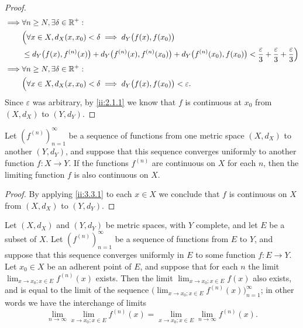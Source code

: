 \begin{proof}
\begin{align*}
    \implies & \forall n \geq N, \exists \delta \in \mathbb{R}^+ :                                                                                                                                                    \\
             & \Big(\forall x \in X, d_X(x, x_0) < \delta \implies d_Y\big(f(x), f(x_0)\big)                                                                                                                  \\
             & \leq d_Y\big(f(x), f^{(n)}(x)\big) + d_Y\big(f^{(n)}(x), f^{(n)}(x_0)\big) + d_Y\big(f^{(n)}(x_0), f(x_0)\big) < \dfrac{\varepsilon}{3} + \dfrac{\varepsilon}{3} + \dfrac{\varepsilon}{3}\Big) \\
    \implies & \forall n \geq N, \exists \delta \in \mathbb{R}^+ :                                                                                                                                                    \\
             & \Big(\forall x \in X, d_X(x, x_0) < \delta \implies d_Y\big(f(x), f(x_0)\big) < \varepsilon.
  \end{align*}
  Since \(\varepsilon\) was arbitrary, by \cref{ii:2.1.1} we know that \(f\) is continuous at \(x_0\) from \((X, d_X)\) to \((Y, d_Y)\).
\end{proof}

\begin{cor}\label{ii:3.3.2}
  Let \((f^{(n)})_{n = 1}^\infty\) be a sequence of functions from one metric space \((X, d_X)\) to another \((Y, d_Y)\), and suppose that this sequence converges uniformly to another function \(f : X \to Y\).
  If the functions \(f^{(n)}\) are continuous on \(X\) for each \(n\), then the limiting function \(f\) is also continuous on \(X\).
\end{cor}

\begin{proof}
  By applying \cref{ii:3.3.1} to each \(x \in X\) we conclude that \(f\) is continuous on \(X\) from \((X, d_X)\) to \((Y, d_Y)\).
\end{proof}

\begin{prop}\label{ii:3.3.3}
  Let
  \((X, d_X)\) and \((Y, d_Y)\) be metric spaces, with \(Y\) complete, and let \(E\) be a subset of \(X\).
  Let \((f^{(n)})_{n = 1}^\infty\) be a sequence of functions from \(E\) to \(Y\), and suppose that this sequence converges uniformly in \(E\) to some function \(f : E \to Y\).
  Let \(x_0 \in X\) be an adherent point of \(E\), and suppose that for each \(n\) the limit \(\lim_{x \to x_0 ; x \in E} f^{(n)}(x)\) exists.
  Then the limit \(\lim_{x \to x_0 ; x \in E} f(x)\) also exists, and is equal to the limit of the sequence \(\big(\lim_{x \to x_0 ; x \in E} f^{(n)}(x)\big)_{n = 1}^\infty\);
  in other words we have the interchange of limits
  \[
    \lim_{n \to \infty} \lim_{x \to x_0 ; x \in E} f^{(n)}(x) = \lim_{x \to x_0 ; x \in E} \lim_{n \to \infty} f^{(n)}(x).
  \]
\end{prop}

